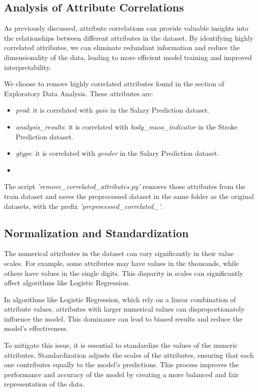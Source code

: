 \documentclass[runningheads]{paper}
\begin{document}
\subsection{Analysis of Attribute Correlations}
As previously discussed, attribute correlations can provide valuable insights
into the relationships between different attributes in the dataset. By identifying
highly correlated attributes, we can eliminate redundant information and reduce
the dimensionality of the data, leading to more efficient model training and
improved interpretability.

We choose to remove highly correlated attributes found in the section of
Exploratory Data Analysis. These attributes are:

\begin{itemize}
    \item \textit{prod}: it is correlated with \textit{gain} in the Salary Prediction dataset.
    \item \textit{analysis\_results}: it is correlated with \textit{body\_mass\_indicator} in the Stroke Prediction dataset.
    \item \textit{gtype}: it is correlated with \textit{gender} in the Salary Prediction dataset.
    \item 
\end{itemize}

The script \textit{'remove\_correlated\_attributes.py'}
removes those attributes from the train dataset and saves the preprocessed dataset
in the same folder as the original datasets, with the prefix \textit{'preprocessed\_correlated\_'}.

\subsection{Normalization and Standardization}
The numerical attributes in the dataset can vary significantly in their value scales. For example, 
some attributes may have values in the thousands, while others have values in the single digits. 
This disparity in scales can significantly affect algorithms like Logistic Regression.

In algorithms like Logistic Regression, which rely on a linear combination of attribute values,
attributes with larger numerical values can disproportionately influence the model. This dominance 
can lead to biased results and reduce the model's effectiveness.

To mitigate this issue, it is essential to standardize the values of the numeric attributes. 
Standardization adjusts the scales of the attributes, ensuring that each one contributes equally 
to the model's predictions. This process improves the performance and accuracy of the model by 
creating a more balanced and fair representation of the data.
\end{document}
